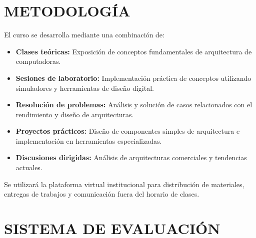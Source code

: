 \documentclass[12pt,a4paper]{article}
\begin{document}
\vspace{0.5cm}

\section{METODOLOGÍA}
\begin{tcolorbox}[colback=pucpGris!5,colframe=pucpGris,title=\textbf{Enfoque Metodológico}]
El curso se desarrolla mediante una combinación de:

\begin{itemize}[leftmargin=*]
    \item \textbf{Clases teóricas:} Exposición de conceptos fundamentales de arquitectura de computadoras.
    \item \textbf{Sesiones de laboratorio:} Implementación práctica de conceptos utilizando simuladores y herramientas de diseño digital.
    \item \textbf{Resolución de problemas:} Análisis y solución de casos relacionados con el rendimiento y diseño de arquitecturas.
    \item \textbf{Proyectos prácticos:} Diseño de componentes simples de arquitectura e implementación en herramientas especializadas.
    \item \textbf{Discusiones dirigidas:} Análisis de arquitecturas comerciales y tendencias actuales.
\end{itemize}

\begin{center}
\end{center}

Se utilizará la plataforma virtual institucional para distribución de materiales, entregas de trabajos y comunicación fuera del horario de clases.
\end{tcolorbox}
\vspace{0.5cm}

\section{SISTEMA DE EVALUACIÓN}
\end{document}
